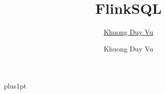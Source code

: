 \documentclass[twoside,12pt]{Latex/Classes/PhDthesisPSnPDF}
\title{FlinkSQL}
\author{\href{mailto:duyvkvn@gmail.com}{Khuong Duy Vu}}
\author{Khuong Duy Vu}
\begin{document}

\renewcommand\baselinestretch{1.2}
\renewcommand*\listfigurename{List of Figures}
\renewcommand*\listtablename{List of Tables}
\renewcommand*\figurename{Figure}
\renewcommand*\contentsname{Contents}
\renewcommand*\tablename{Table}
\baselineskip=18pt plus1pt



\maketitle  %













%   



%

%


\end{document}
